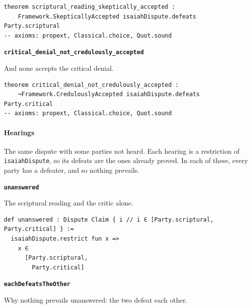 \documentclass[11pt]{article}
\begin{document}
{\small\begin{verbatim}
theorem scriptural_reading_skeptically_accepted :
    Framework.SkepticallyAccepted isaiahDispute.defeats Party.scriptural
-- axioms: propext, Classical.choice, Quot.sound
\end{verbatim}}
\par\medskip\noindent\textbf{\texttt{critical\_\allowbreak{}denial\_\allowbreak{}not\_\allowbreak{}credulously\_\allowbreak{}accepted}}\par\nobreak\noindent
And none accepts the critical denial.

{\small\begin{verbatim}
theorem critical_denial_not_credulously_accepted :
    ¬Framework.CredulouslyAccepted isaiahDispute.defeats Party.critical
-- axioms: propext, Classical.choice, Quot.sound
\end{verbatim}}
\paragraph*{Hearings}
\leavevmode\par
The same dispute with some parties not heard. Each hearing is a restriction of \texttt{isaiah\allowbreak{}Dispute}, so its defeats are the ones already proved. In each of these, every party has a defeater, and so nothing prevails.

\par\medskip\noindent\textbf{\texttt{unanswered}}\par\nobreak\noindent
The scriptural reading and the critic alone.

{\small\begin{verbatim}
def unanswered : Dispute Claim { i // i ∈ [Party.scriptural, Party.critical] } :=
  isaiahDispute.restrict fun x =>
    x ∈
      [Party.scriptural,
        Party.critical]
\end{verbatim}}
\par\medskip\noindent\textbf{\texttt{each\allowbreak{}Defeats\allowbreak{}The\allowbreak{}Other}}\par\nobreak\noindent
Why nothing prevails unanswered: the two defeat each other.
\end{document}

